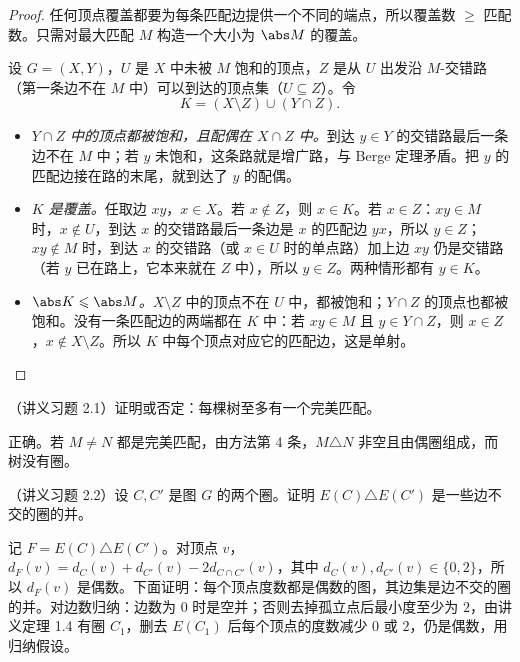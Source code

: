 \begin{proof}
任何顶点覆盖都要为每条匹配边提供一个不同的端点，所以覆盖数 $\geqslant$ 匹配数。只需对最大匹配 $M$ 构造一个大小为 $\abs M$ 的覆盖。

设 $G=(X,Y)$，$U$ 是 $X$ 中未被 $M$ 饱和的顶点，$Z$ 是从 $U$ 出发沿 $M$-交错路（第一条边不在 $M$ 中）可以到达的顶点集（$U\subseteq Z$）。令
\[
K=(X\setminus Z)\cup(Y\cap Z).
\]
\begin{itemize}
\item \emph{$Y\cap Z$ 中的顶点都被饱和，且配偶在 $X\cap Z$ 中。}到达 $y\in Y$ 的交错路最后一条边不在 $M$ 中；若 $y$ 未饱和，这条路就是增广路，与 Berge 定理矛盾。把 $y$ 的匹配边接在路的末尾，就到达了 $y$ 的配偶。
\item \emph{$K$ 是覆盖。}任取边 $xy$，$x\in X$。若 $x\notin Z$，则 $x\in K$。若 $x\in Z$：$xy\in M$ 时，$x\notin U$，到达 $x$ 的交错路最后一条边是 $x$ 的匹配边 $yx$，所以 $y\in Z$；$xy\notin M$ 时，到达 $x$ 的交错路（或 $x\in U$ 时的单点路）加上边 $xy$ 仍是交错路（若 $y$ 已在路上，它本来就在 $Z$ 中），所以 $y\in Z$。两种情形都有 $y\in K$。
\item \emph{$\abs K\leqslant\abs M$。}$X\setminus Z$ 中的顶点不在 $U$ 中，都被饱和；$Y\cap Z$ 的顶点也都被饱和。没有一条匹配边的两端都在 $K$ 中：若 $xy\in M$ 且 $y\in Y\cap Z$，则 $x\in Z$，$x\notin X\setminus Z$。所以 $K$ 中每个顶点对应它的匹配边，这是单射。\qedhere
\end{itemize}
\end{proof}

\begin{workedexample}\label{we:augmenting-paths:tree}
（讲义习题 2.1）证明或否定：每棵树至多有一个完美匹配。
\end{workedexample}
\begin{solution}
正确。若 $M\neq N$ 都是完美匹配，由方法第 4 条，$M\triangle N$ 非空且由偶圈组成，而树没有圈。
\end{solution}

\begin{workedexample}\label{we:augmenting-paths:cycle-sum}
（讲义习题 2.2）设 $C,C'$ 是图 $G$ 的两个圈。证明 $E(C)\triangle E(C')$ 是一些边不交的圈的并。
\end{workedexample}
\begin{solution}
记 $F=E(C)\triangle E(C')$。对顶点 $v$，$d_F(v)=d_C(v)+d_{C'}(v)-2d_{C\cap C'}(v)$，其中 $d_C(v),d_{C'}(v)\in\{0,2\}$，所以 $d_F(v)$ 是偶数。下面证明：每个顶点度数都是偶数的图，其边集是边不交的圈的并。对边数归纳：边数为 $0$ 时是空并；否则去掉孤立点后最小度至少为 $2$，由讲义定理 1.4 有圈 $C_1$，删去 $E(C_1)$ 后每个顶点的度数减少 $0$ 或 $2$，仍是偶数，用归纳假设。
\end{solution}

